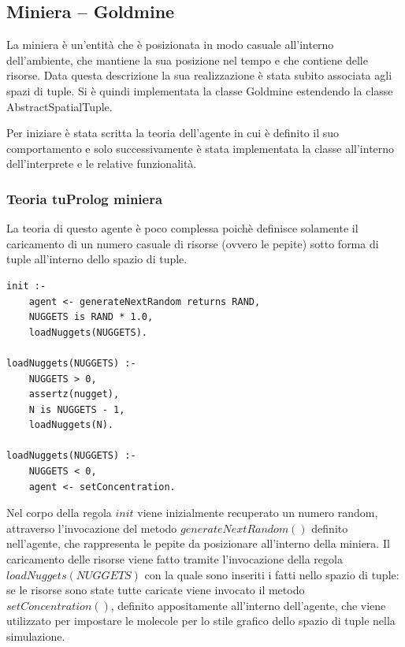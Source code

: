 \subsection{Miniera -- Goldmine}
La miniera è un'entità che è posizionata in modo casuale all'interno dell'ambiente, che mantiene la sua posizione nel tempo e che contiene delle risorse.
Data questa descrizione la sua realizzazione è stata subito associata agli spazi di tuple. Si è quindi implementata la classe Goldmine estendendo la classe AbstractSpatialTuple.

Per iniziare è stata scritta la teoria dell'agente in cui è definito il suo comportamento e solo successivamente è stata implementata la classe all'interno dell'interprete e le relative funzionalità.

\subsubsection{Teoria tuProlog miniera}
La teoria di questo agente è poco complessa poichè definisce solamente il caricamento di un numero casuale di risorse (ovvero le pepite) sotto forma di tuple all'interno dello spazio di tuple.

\switchToProlog{}
\begin{lstlisting}[float,firstnumber=1,label={lst:Goldmine},caption={Teoria miniera}]
init :-
    agent <- generateNextRandom returns RAND,
    NUGGETS is RAND * 1.0,
    loadNuggets(NUGGETS).

loadNuggets(NUGGETS) :-
    NUGGETS > 0,
    assertz(nugget),
    N is NUGGETS - 1,
    loadNuggets(N).

loadNuggets(NUGGETS) :-
    NUGGETS < 0,
    agent <- setConcentration.
\end{lstlisting}

Nel corpo della regola $init$ viene inizialmente recuperato un numero random, attraverso l'invocazione del metodo $generateNextRandom()$ definito nell'agente, che rappresenta le pepite da posizionare all'interno della miniera.
Il caricamento delle risorse viene fatto tramite l'invocazione della regola $loadNuggets(NUGGETS)$ con la quale sono inseriti i fatti nello spazio di tuple: se le risorse sono state tutte caricate viene invocato il metodo $setConcentration()$, definito appositamente all'interno dell'agente, che viene utilizzato per impostare le molecole per lo stile grafico dello spazio di tuple nella simulazione.

